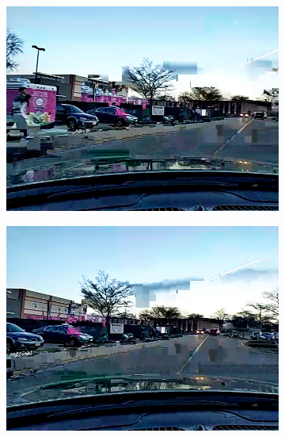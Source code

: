 \begin{figure}[!t]
\begin{subfigure}[t]{0.25\textwidth}
    \includegraphics[width=\linewidth]{Figs/RTDrive/evaluation/frames/default_2.png}
  \end{subfigure}%
  \begin{subfigure}[t]{0.25\textwidth}
    \includegraphics[width=\linewidth]{Figs/RTDrive/evaluation/frames/default_3.png}
  \end{subfigure}%
  \label{default_encoding_images}
  

\end{figure}
